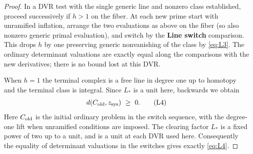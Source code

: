 \begin{proof}
In a DVR test with the single generic line and nonzero class established, proceed successively if \(h>1\) on the fiber. At each new prime start with unramified inflation, arrange the two evaluations as above on the fiber (so also nonzero generic primal evaluation), and switch by the \textbf{Line switch} comparison. This drops \(h\) by one preserving generic nonvanishing of the class by \eqref{eq:L3}. The ordinary determinant valuations are exactly equal along the comparisons with the new derivatives; there is no bound lost at this DVR. 

When \(h=1\) the terminal complex is a free line in degree one up to homotopy and the terminal class is integral. Since \(L_*\) is a unit here, backwards we obtain
\[
                         d(C_{\rm old},z_{\rm sys})\ \ge\ 0.         \tag{L4}\label{eq:L4}
\]
Here \(C_{\rm old}\) is the initial ordinary problem in the switch sequence,
with the degree-one lift when unramified conditions are imposed. The clearing
factor \(L_*\) is a fixed power of two up to a unit, and is a unit at each
DVR used here. Consequently the equality of determinant valuations in the
switches gives exactly \eqref{eq:L4}.
\end{proof}

